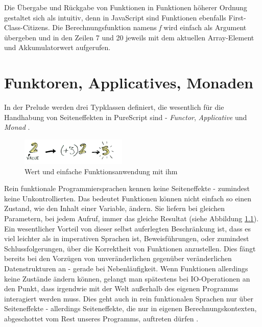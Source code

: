 \documentclass[
12pt,
ngerman,
oneside]
{scrbook} %
\begin{document}
Die Übergabe und Rückgabe von Funktionen in Funktionen höherer Ordnung gestaltet sich als intuitiv, denn in JavaScript sind Funktionen ebenfalls First-Class-Citizens. Die Berechnungsfunktion namens \emph{f} wird einfach als Argument übergeben und in den Zeilen 7 und 20 jeweils mit dem aktuellen Array-Element und Akkumulatorwert aufgerufen.


\chapter{Funktoren, Applicatives, Monaden}
In der Prelude werden drei Typklassen definiert, die wesentlich für die Handhabung von Seiteneffekten in PureScript sind -  \emph{Functor}, \emph{Applicative} und \emph{Monad} \cite[][S. 68]{Freeman17}. 

\begin{figure} %
	\begin{center}
		\includegraphics[width=0.45\textwidth]{Pictures/value-apply.png}
	\end{center}
	\caption{Wert und einfache Funktionsanwendung mit ihm \cite[][]{AdityaBhargava13}}
	\label{fig:SimpleValue}
\end{figure}

Rein funktionale Programmiersprachen kennen keine Seiteneffekte - zumindest keine Unkontrollierten. Das bedeutet Funktionen können \glqq nicht einfach so\grqq{} einen Zustand, wie den Inhalt einer Variable, ändern. Sie liefern bei gleichen Parametern, bei jedem Aufruf, immer das gleiche Resultat (siehe Abbildung \ref{fig:SimpleValue}). Ein wesentlicher Vorteil von dieser selbst auferlegten Beschränkung ist, dass es viel leichter als in imperativen Sprachen ist, Beweisführungen, oder zumindest Schlussfolgerungen, über die Korrektheit von Funktionen anzustellen. Dies fängt bereits bei den Vorzügen von unveränderlichen gegenüber veränderlichen Datenstrukturen an - gerade bei Nebenläufigkeit. Wenn Funktionen allerdings keine Zustände ändern können, gelangt man spätestens bei IO-Operationen an den Punkt, dass irgendwie mit der Welt außerhalb des eigenen Programms interagiert werden muss. Dies geht auch in rein funktionalen Sprachen nur über Seiteneffekte - allerdings Seiteneffekte, die nur in eigenen Berechnungskontexten, abgeschottet vom Rest unseres Programms, auftreten dürfen \cite[Kap. Input and Output]{Haskell11}.
\end{document}
